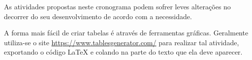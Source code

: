 
As atividades propostas neste cronograma podem sofrer leves alterações no decorrer do seu desenvolvimento de acordo com a necessidade.

A forma mais fácil de criar tabelas é através de ferramentas gráficas. Geralmente utiliza-se o site \url{https://www.tablesgenerator.com/} para realizar tal atividade, exportando o código LaTeX e colando na parte do texto que ela deve aparecer.